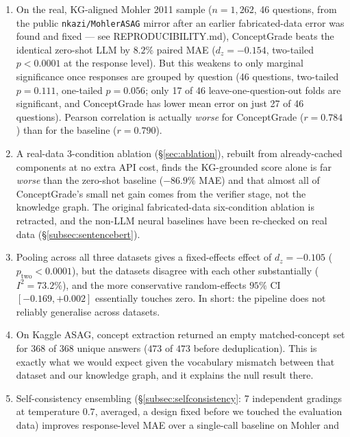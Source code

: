 \documentclass[conference]{IEEEtran}
\begin{document}
\begin{enumerate}
  \item On the real, KG-aligned Mohler 2011 sample ($n=1{,}262$, 46
        questions, from the public \texttt{nkazi/MohlerASAG} mirror
        after an earlier fabricated-data error was found and fixed ---
        see REPRODUCIBILITY.md), ConceptGrade beats the identical
        zero-shot LLM by $8.2\%$ paired MAE ($d_z = -0.154$, two-tailed
        $p<0.0001$ at the response level). But this weakens to only
        marginal significance once responses are grouped by question
        (46 questions, two-tailed $p=0.111$, one-tailed $p=0.056$; only
        17 of 46 leave-one-question-out folds are significant, and
        ConceptGrade has lower mean error on just 27 of 46 questions).
        Pearson correlation is actually \emph{worse} for ConceptGrade
        ($r=0.784$) than for the baseline ($r=0.790$).
  \item A real-data 3-condition ablation (\S\ref{sec:ablation}),
        rebuilt from already-cached components at no extra API cost,
        finds the KG-grounded score alone is far \emph{worse} than the
        zero-shot baseline ($-86.9\%$ MAE) and that almost all of
        ConceptGrade's small net gain comes from the verifier stage,
        not the knowledge graph. The original fabricated-data
        six-condition ablation is retracted, and the non-LLM neural
        baselines have been re-checked on real data
        (\S\ref{subsec:sentencebert}).
  \item Pooling across all three datasets gives a fixed-effects effect
        of $d_z = -0.105$ ($p_{\text{two}} < 0.0001$), but the datasets
        disagree with each other substantially ($I^2 = 73.2\%$), and
        the more conservative random-effects $95\%$ CI
        $[-0.169, +0.002]$ essentially touches zero. In short: the
        pipeline does not reliably generalise across datasets.
  \item On Kaggle ASAG, concept extraction returned an empty
        matched-concept set for $368$ of $368$ unique answers ($473$ of
        $473$ before deduplication). This is exactly what we would
        expect given the vocabulary mismatch between that dataset and
        our knowledge graph, and it explains the null result there.
  \item Self-consistency ensembling (\S\ref{subsec:selfconsistency}: 7
        independent gradings at temperature $0.7$, averaged, a design
        fixed before we touched the evaluation data) improves
        response-level MAE over a single-call baseline on Mohler and

\end{enumerate}
\end{document}
